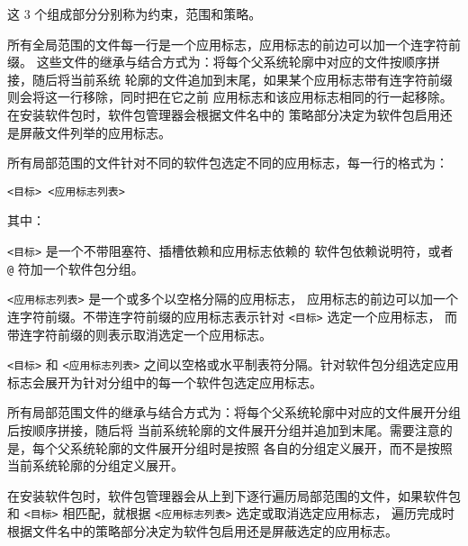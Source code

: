 这 3 个组成部分分别称为约束，范围和策略。

所有全局范围的文件每一行是一个应用标志，应用标志的前边可以加一个连字符前缀。
这些文件的继承与结合方式为：将每个父系统轮廓中对应的文件按顺序拼接，随后将当前系统
轮廓的文件追加到末尾，如果某个应用标志带有连字符前缀则会将这一行移除，同时把在它之前
应用标志和该应用标志相同的行一起移除。在安装软件包时，软件包管理器会根据文件名中的
策略部分决定为软件包启用还是屏蔽文件列举的应用标志。

所有局部范围的文件针对不同的软件包选定不同的应用标志，每一行的格式为：

\begin{verbatim}
<目标> <应用标志列表>
\end{verbatim}

其中：
\begin{compactitem}
\item \texttt{<\hspace{0em}目标\hspace{0em}>} 是一个不带阻塞符、插槽依赖和应用标志依赖的
    软件包依赖说明符，或者 \texttt{@} 符加一个软件包分组。
\item \texttt{<\hspace{0em}应用标志列表\hspace{0em}>} 是一个或多个以空格分隔的应用标志，
    应用标志的前边可以加一个连字符前缀。不带连字符前缀的应用标志表示针对
    \texttt{<\hspace{0em}目标\hspace{0em}>} 选定一个应用标志，
    而带连字符前缀的则表示取消选定一个应用标志。
\end{compactitem}

\texttt{<\hspace{0em}目标\hspace{0em}>} 和 \texttt{<\hspace{0em}应用标志列表\hspace{0em}>}
之间以空格或水平制表符分隔。针对软件包分组选定应用标志会展开为针对分组中的每一个软件包选定应用标志。

所有局部范围文件的继承与结合方式为：将每个父系统轮廓中对应的文件展开分组后按顺序拼接，随后将
当前系统轮廓的文件展开分组并追加到末尾。需要注意的是，每个父系统轮廓的文件展开分组时是按照
各自的分组定义展开，而不是按照当前系统轮廓的分组定义展开。

在安装软件包时，软件包管理器会从上到下逐行遍历局部范围的文件，如果软件包和
\texttt{<\hspace{0em}目标\hspace{0em}>} 相匹配，就根据
\texttt{<\hspace{0em}应用标志列表\hspace{0em}>} 选定或取消选定应用标志，
遍历完成时根据文件名中的策略部分决定为软件包启用还是屏蔽选定的应用标志。

